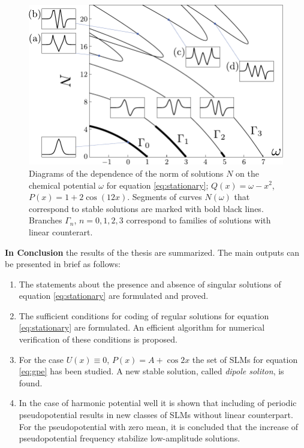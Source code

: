 \documentclass[candidate, href, colorlinks]{disser}
\begin{document}
\begin{figure}[h]
\centering
	\includegraphics[scale = 1]{pic/branches}
	\caption{
		Diagrams of the dependence of the norm of solutions $N$ on the chemical potential $\omega$ for equation \eqref{eq:stationary}; $Q(x) = \omega - x^2$, $P(x) = 1 + 2 \cos (12 x)$.
		Segments of curves $N(\omega)$ that correspond to stable solutions are marked with bold black lines.
		Branches $\Gamma_n$, $n = 0, 1, 2, 3$ correspond to families of solutions with linear counterart.
	}
\label{fig:branches}
\end{figure}


\textbf{In Conclusion} the results of the thesis are summarized.
The main outputs can be presented in brief as follows: 
\begin{enumerate}
	\item The statements about the presence and absence of singular solutions of equation \eqref{eq:stationary} are formulated and proved.
	\item The sufficient conditions for coding of regular solutions for equation \eqref{eq:stationary} are formulated.
	An efficient algorithm for numerical verification of these conditions is proposed.
	\item For the case $U(x) \equiv 0$, $P(x) = A + \cos 2x$ the set of SLMs for equation \eqref{eq:gpe} has been studied.
	A new stable solution, called {\it dipole soliton}, is found.
	\item In the case of harmonic potential well it is shown that including of periodic pseudopotential results in new classes of SLMs without linear counterpart.
		For the pseudopotential with zero mean, it is concluded that the increase of pseudopotential frequency stabilize low-amplitude solutions.
\end{enumerate}
\end{document}
